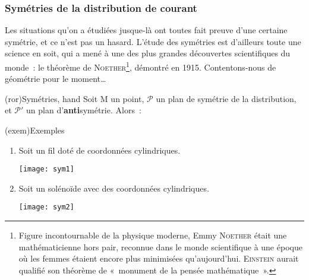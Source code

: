 \documentclass[../../main/main.tex]{subfiles}
\begin{document}
\subsubsection{Symétries de la distribution de courant}
\label{sssec:symdist}
Les situations qu'on a étudiées jusque-là ont toutes fait preuve d'une certaine
symétrie, et ce n'est pas un hasard. L'étude des symétries est d'ailleurs toute
une science en soit, qui a mené à une des plus grandes découvertes scientifiques
du monde~: le théorème de \textsc{Noether}\footnote{Figure incontournable de la
	physique moderne, Emmy \textsc{Noether} était une mathématicienne hors pair,
	reconnue dans le monde scientifique à une époque où les femmes étaient encore
	plus minimisées qu'aujourd'hui. \textsc{Einstein} aurait qualifié son théorème
	de «~monument de la pensée mathématique~».}, démontré en 1915. Contentons-nous
de géométrie pour le moment…
\begin{tcb}(ror){Symétries, hand}
	Soit M un point, $\mathcal{P}$ un plan de symétrie de la distribution, et
	$\mathcal{P'}$ un plan d'\textbf{anti}symétrie. Alors~:
\end{tcb}
\begin{tcb}(exem){Exemples}
	\begin{enumerate}
		\item Soit un fil doté de coordonnées cylindriques.
		      \begin{center}
			      \texttt{[image: sym1]}
		      \end{center}
		\item Soit un solénoïde avec des coordonnées cylindriques.
		      \begin{center}
			      \texttt{[image: sym2]}
		      \end{center}
	\end{enumerate}
\end{tcb}
\end{document}

